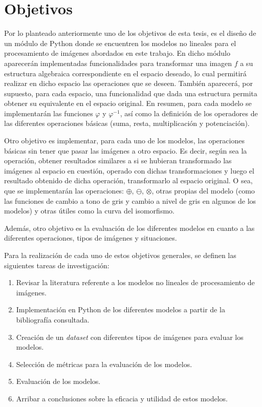 \section*{Objetivos}

Por lo planteado anteriormente uno de los objetivos de esta tesis, es el dise\~no de un m\'odulo de Python donde se encuentren los modelos no lineales para el procesamiento de im\'agenes abordados en este trabajo. En dicho m\'odulo aparecer\'an implementadas funcionalidades para transformar una imagen $f$ a su estructura algebraica correspondiente en el espacio deseado, lo cual permitir\'a realizar en dicho espacio las operaciones que se deseen. Tambi\'en aparecer\'a, por supuesto, para cada espacio, una funcionalidad que dada una estructura permita obtener su equivalente en el espacio original. En resumen, para cada modelo se implementar\'an las funciones $\varphi$ y $\varphi^{-1}$, as\'i como la definici\'on de los operadores de las diferentes operaciones b\'asicas (suma, resta, multiplicaci\'on y potenciaci\'on).

Otro objetivo es implementar, para cada uno de los modelos, las operaciones b\'asicas sin tener que pasar las im\'agenes a otro espacio. Es decir, seg\'un sea la operaci\'on, obtener resultados similares a si se hubieran transformado las im\'agenes al espacio en cuesti\'on, operado con dichas transformaciones y luego el resultado obtenido de dicha operaci\'on, transformarlo al espacio original. O sea, que se implementar\'an las operaciones: $\oplus$, $\ominus$, $\otimes$, otras propias del modelo (como las funciones de cambio a tono de gris y cambio a nivel de gris en algunos de los modelos) y otras \'utiles como la curva del isomorfismo.

Adem\'as, otro objetivo es la evaluaci\'on de los diferentes modelos en cuanto a las diferentes operaciones, tipos de im\'agenes y situaciones.

Para la realizaci\'on de cada uno de estos objetivos generales, se definen las siguientes tareas de investigaci\'on:

\begin{enumerate}
	\item Revisar la literatura referente a los modelos no lineales de procesamiento de im\'agenes.
	\item Implementaci\'on en Python de los diferentes modelos a partir de la bibliograf\'ia consultada.
	\item Creaci\'on de un \textit{dataset} con diferentes tipos de im\'agenes para evaluar los modelos.
	\item Selecci\'on de m\'etricas para la evaluaci\'on de los modelos.
	\item Evaluaci\'on de los modelos.
	\item Arribar a conclusiones sobre la eficacia y utilidad de estos modelos. 
\end{enumerate}

